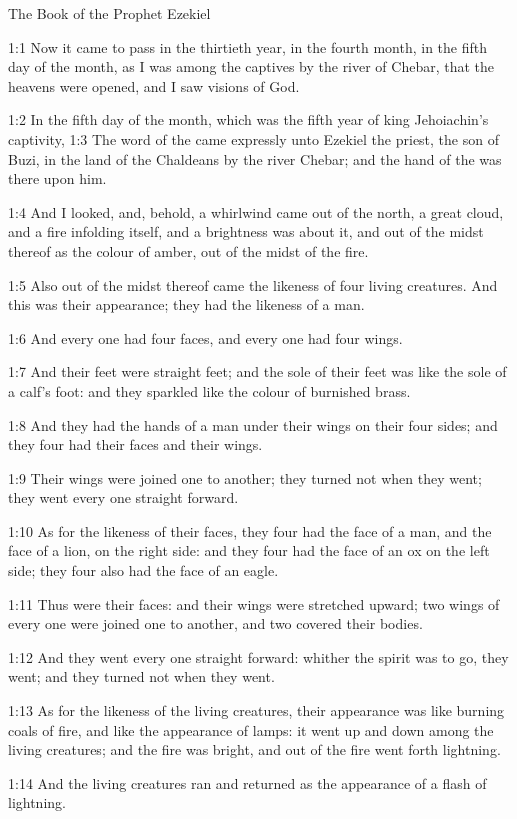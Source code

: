 The Book of the Prophet Ezekiel


1:1 Now it came to pass in the thirtieth year, in the fourth month,
in the fifth day of the month, as I was among the captives by the river
of Chebar, that the heavens were opened, and I saw visions of God.

1:2 In the fifth day of the month, which was the fifth year of king
Jehoiachin's captivity, 1:3 The word of the \LORD came expressly unto
Ezekiel the priest, the son of Buzi, in the land of the Chaldeans by
the river Chebar; and the hand of the \LORD was there upon him.

1:4 And I looked, and, behold, a whirlwind came out of the north, a
great cloud, and a fire infolding itself, and a brightness was about
it, and out of the midst thereof as the colour of amber, out of the
midst of the fire.

1:5 Also out of the midst thereof came the likeness of four living
creatures. And this was their appearance; they had the likeness of a
man.

1:6 And every one had four faces, and every one had four wings.

1:7 And their feet were straight feet; and the sole of their feet was
like the sole of a calf's foot: and they sparkled like the colour of
burnished brass.

1:8 And they had the hands of a man under their wings on their four
sides; and they four had their faces and their wings.

1:9 Their wings were joined one to another; they turned not when they
went; they went every one straight forward.

1:10 As for the likeness of their faces, they four had the face of a
man, and the face of a lion, on the right side: and they four had the
face of an ox on the left side; they four also had the face of an
eagle.

1:11 Thus were their faces: and their wings were stretched upward; two
wings of every one were joined one to another, and two covered their
bodies.

1:12 And they went every one straight forward: whither the spirit was
to go, they went; and they turned not when they went.

1:13 As for the likeness of the living creatures, their appearance was
like burning coals of fire, and like the appearance of lamps: it went
up and down among the living creatures; and the fire was bright, and
out of the fire went forth lightning.

1:14 And the living creatures ran and returned as the appearance of a
flash of lightning.

